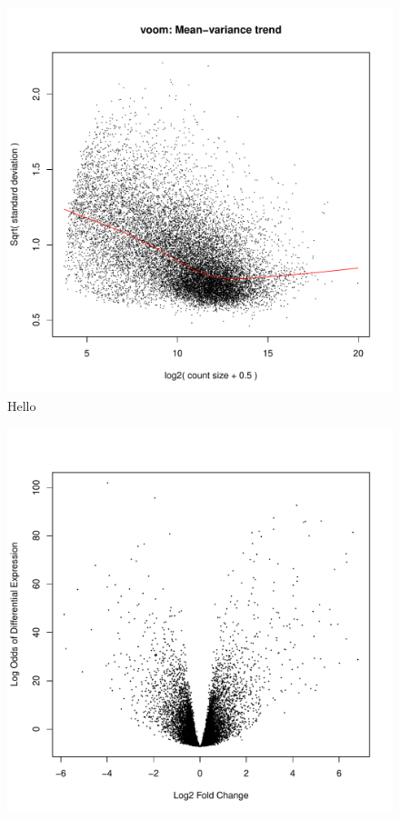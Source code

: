 \documentclass[10pt,twocolumn]{article}\usepackage[]{graphicx}\usepackage[]{color}
\makeatletter
\def\maxwidth{ %
  \ifdim\Gin@nat@width>\linewidth
    \linewidth
  \else
    \Gin@nat@width
  \fi
}
\newenvironment{knitrout}{}{} %
\makeatother
\begin{document}
\begin{knitrout}
\color{fgcolor}\begin{figure}[ht]

{\centering \includegraphics[width=\maxwidth]{figure/unnamed-chunk-3-1} 

}

\caption[Hello]{Hello}\label{fig:unnamed-chunk-31}
\end{figure}

\begin{figure}[ht]

{\centering \includegraphics[width=\maxwidth]{figure/unnamed-chunk-3-2} 

}
\end{figure}
\end{knitrout}
\end{document}
